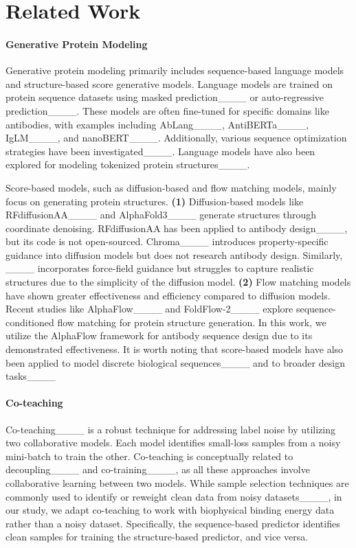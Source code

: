 \section{Related Work}
\label{appendix: related_work}



\paragraph{Generative Protein Modeling}
Generative protein modeling primarily includes sequence-based language models and structure-based score generative models. Language models are trained on protein sequence datasets using masked prediction____ or auto-regressive prediction____. These models are often fine-tuned for specific domains like antibodies, with examples including AbLang____, AntiBERTa____, IgLM____, and nanoBERT____.
%
Additionally, various sequence optimization strategies have been investigated____.
%
Language models have also been explored for modeling tokenized protein structures____.
%


Score-based models, such as diffusion-based and flow matching models, mainly focus on generating protein structures. \textbf{(1)} Diffusion-based models like RFdiffusionAA____ and AlphaFold3____ generate structures through coordinate denoising. RFdiffusionAA has been applied to antibody design____, but its code is not open-sourced. Chroma____ introduces property-specific guidance into diffusion models but does not research antibody design. Similarly, ____ incorporates force-field guidance but struggles to capture realistic structures due to the simplicity of the diffusion model.
%
\textbf{(2)} Flow matching models have shown greater effectiveness and efficiency compared to diffusion models. Recent studies like AlphaFlow____ and FoldFlow-2____ explore sequence-conditioned flow matching for protein structure generation. In this work, we utilize the AlphaFlow framework for antibody sequence design due to its demonstrated effectiveness.
%
It is worth noting that score-based models have also been applied to model discrete biological sequences____ and to broader design tasks____

\paragraph{Co-teaching}
%
Co-teaching____ is a robust technique for addressing label noise by utilizing two collaborative models. Each model identifies small-loss samples from a noisy mini-batch to train the other. Co-teaching is conceptually related to decoupling____ and co-training____, as all these approaches involve collaborative learning between two models. 
%
While sample selection techniques are commonly used to identify or reweight clean data from noisy datasets____, in our study, we adapt co-teaching to work with biophysical binding energy data rather than a noisy dataset. Specifically, the sequence-based predictor identifies clean samples for training the structure-based predictor, and vice versa.
%